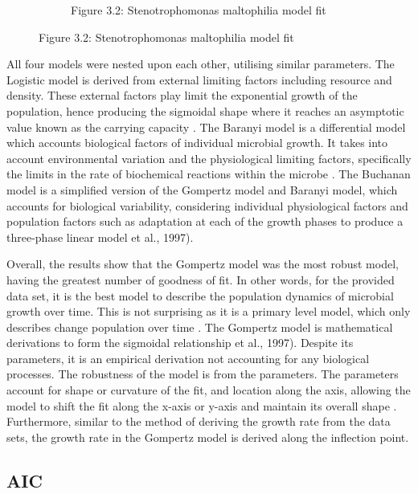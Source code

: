 \begin{figure}[h!]
\begin{subfigure}[h]{0.4\textwidth}
        \caption{Figure 3.2: Stenotrophomonas maltophilia model fit}
        \label{fig:Stenotrophomonas maltophilia}
    \end{subfigure}
\end{figure}

All four models were nested upon each other, utilising similar parameters. The Logistic model is derived from external limiting factors including resource and density. These external factors play limit the exponential growth of the population, hence producing the sigmoidal shape where it reaches an asymptotic value known as the carrying capacity \cite{webb1986logistic}. The Baranyi model is a differential model which accounts biological factors of individual microbial growth. It takes into account environmental variation and the physiological limiting factors, specifically the limits in the rate of biochemical reactions within the microbe \cite{buchanan1997simple, grijspeerdt1999estimating}. The Buchanan model is a simplified version of the Gompertz model and Baranyi model, which accounts for biological variability, considering individual physiological factors and population factors such as adaptation at each of the growth phases to produce a three-phase linear model \cite{buchanan1997simple} et al., 1997).

Overall, the results show that the Gompertz model was the most robust model, having the greatest number of goodness of fit. In other words, for the provided data set, it is the best model to describe the population dynamics of microbial growth over time. This is not surprising as it is a primary level model, which only describes change population over time \cite{grijspeerdt1999estimating}. The Gompertz model is mathematical derivations to form the sigmoidal relationship \cite{buchanan1997simple} et al., 1997). Despite its parameters, it is an empirical derivation not accounting for any biological processes. The robustness of the model is from the parameters. The parameters account for shape or curvature of the fit, and location along the axis, allowing the model to shift the fit along the x-axis or y-axis and maintain its overall shape \cite{tjorve2017use}. Furthermore, similar to the method of deriving the growth rate from the data sets, the growth rate in the Gompertz model is derived along the inflection point.

\subsection{AIC}

